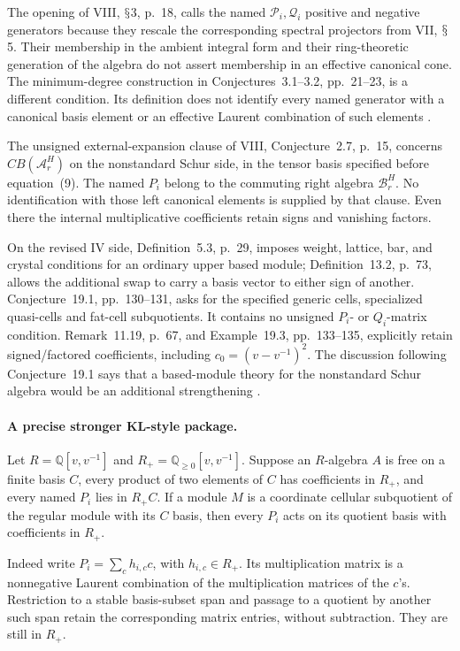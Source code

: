 \documentclass[11pt,a4paper]{article}
\renewcommand{\S}{\ensuremath{\mathsection}}
\theoremstyle{named}\newtheorem{finding}{Finding}[section]
\theoremstyle{definition}\newtheorem{definition}[finding]{Definition}
\theoremstyle{remark}\newtheorem{remark}[finding]{Remark}
\begin{document}
The opening of VIII, \S3, p.~18, calls the named
\(\mathcal P_i,\mathcal Q_i\) positive and negative
generators because they rescale the corresponding
spectral projectors from VII, \S5.
Their membership in the ambient integral form and their
ring-theoretic generation of the algebra do not assert
membership in an effective canonical cone.
The minimum-degree construction in Conjectures~3.1--3.2,
pp.~21--23, is a different condition.
Its definition does not identify every named generator
with a canonical basis element or an effective Laurent
combination of such elements \cite{VII,VIII}.

The unsigned external-expansion clause of VIII,
Conjecture~2.7, p.~15, concerns \(CB(\mathcal A_r^H)\)
on the nonstandard Schur side, in the tensor basis
specified before equation~(9).
The named \(P_i\) belong to the commuting right algebra
\(\mathcal B_r^H\). No identification with those left
canonical elements is supplied by that clause.
Even there the internal multiplicative coefficients
retain signs and vanishing factors.

On the revised IV side, Definition~5.3, p.~29, imposes
weight, lattice, bar, and crystal conditions for an
ordinary upper based module; Definition~13.2, p.~73,
allows the additional swap to carry a basis vector to
either sign of another.
Conjecture~19.1, pp.~130--131, asks for the specified
generic cells, specialized quasi-cells and fat-cell
subquotients. It contains no unsigned \(P_i\)- or
\(Q_i\)-matrix condition.
Remark~11.19, p.~67, and Example~19.3, pp.~133--135,
explicitly retain signed/factored coefficients,
including \(c_0=(v-v^{-1})^2\).
The discussion following Conjecture~19.1 says that a
based-module theory for the nonstandard Schur algebra
would be an additional strengthening \cite{IV}.

\paragraph{A precise stronger KL-style package.}
Let \(R=\mathbb Q[v,v^{-1}]\) and
\(R_+=\mathbb Q_{\ge0}[v,v^{-1}]\).
Suppose an \(R\)-algebra \(A\) is free on a finite basis
\(C\), every product of two elements of \(C\) has
coefficients in \(R_+\), and every named \(P_i\) lies
in \(R_+C\).
If a module \(M\) is a coordinate cellular subquotient
of the regular module with its \(C\) basis, then every
\(P_i\) acts on its quotient basis with coefficients
in \(R_+\).

Indeed write \(P_i=\sum_c h_{i,c}c\), with
\(h_{i,c}\in R_+\). Its multiplication matrix is a
nonnegative Laurent combination of the multiplication
matrices of the \(c\)'s.
Restriction to a stable basis-subset span and passage
to a quotient by another such span retain the
corresponding matrix entries, without subtraction.
They are still in \(R_+\).
\end{document}
